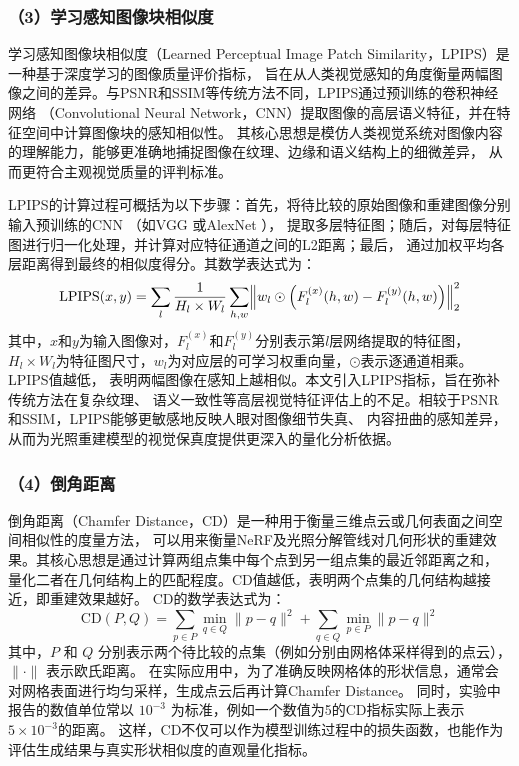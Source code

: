 \subsubsection*{（3）学习感知图像块相似度} 

学习感知图像块相似度（Learned Perceptual Image Patch Similarity，LPIPS）是一种基于深度学习的图像质量评价指标，
旨在从人类视觉感知的角度衡量两幅图像之间的差异。与PSNR和SSIM等传统方法不同，LPIPS通过预训练的卷积神经网络
（Convolutional Neural Network，CNN）提取图像的高层语义特征，并在特征空间中计算图像块的感知相似性。
其核心思想是模仿人类视觉系统对图像内容的理解能力，能够更准确地捕捉图像在纹理、边缘和语义结构上的细微差异，
从而更符合主观视觉质量的评判标准。

LPIPS的计算过程可概括为以下步骤：首先，将待比较的原始图像和重建图像分别输入预训练的CNN
（如VGG \cite{journals/corr/SimonyanZ14a}或AlexNet \cite{NIPS2012_c399862d}），
提取多层特征图；随后，对每层特征图进行归一化处理，并计算对应特征通道之间的L2距离；最后，
通过加权平均各层距离得到最终的相似度得分。其数学表达式为：
\begin{equation}\label{eq:lpips}
  \mathrm{LPIPS}(x,y)=
  \sum_{l}\frac{1}{H_{l}\times W_{l}}
  \sum_{h,w} \Bigl \Vert w_{l} \odot \Bigl(F_{l}^{(x)}(h,w)-F_{l}^{(y)}(h,w) \Bigr) \Bigr \Vert_{2}^{2}
\end{equation}
其中，$x$和$y$为输入图像对，$F_{l}^{(x)}$和$F_{l}^{(y)}$分别表示第$l$层网络提取的特征图，
$H_{l}\times W_{l}$为特征图尺寸，$w_{l}$为对应层的可学习权重向量，$\odot$表示逐通道相乘。LPIPS值越低，
表明两幅图像在感知上越相似。本文引入LPIPS指标，旨在弥补传统方法在复杂纹理、
语义一致性等高层视觉特征评估上的不足。相较于PSNR和SSIM，LPIPS能够更敏感地反映人眼对图像细节失真、
内容扭曲的感知差异，从而为光照重建模型的视觉保真度提供更深入的量化分析依据。

\subsubsection*{（4）倒角距离}

倒角距离（Chamfer Distance，CD）是一种用于衡量三维点云或几何表面之间空间相似性的度量方法，
可以用来衡量NeRF及光照分解管线对几何形状的重建效果。其核心思想是通过计算两组点集中每个点到另一组点集的最近邻距离之和，
量化二者在几何结构上的匹配程度。CD值越低，表明两个点集的几何结构越接近，即重建效果越好。
CD的数学表达式为：
\begin{equation}\label{eq:CD}
\mathrm{CD}(P,Q)= \sum_{p \in P} \min_{q \in Q} \|p - q\|^2 + \sum_{q \in Q} \min_{p \in P} \|p - q\|^2
\end{equation}
其中，\(P\) 和 \(Q\) 分别表示两个待比较的点集（例如分别由网格体采样得到的点云），\(\|\cdot\|\) 表示欧氏距离。
在实际应用中，为了准确反映网格体的形状信息，通常会对网格表面进行均匀采样，生成点云后再计算Chamfer Distance。
同时，实验中报告的数值单位常以 \(10^{-3}\) 为标准，例如一个数值为5的CD指标实际上表示\(5 \times 10^{-3}\)的距离。
这样，CD不仅可以作为模型训练过程中的损失函数，也能作为评估生成结果与真实形状相似度的直观量化指标。

